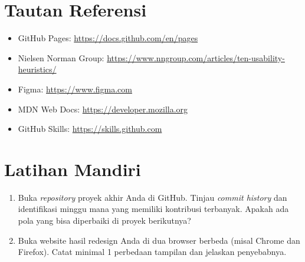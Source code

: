 \section{Tautan Referensi}
\label{sec:referensi-minggu-16}

\begin{itemize}
  \item GitHub Pages: \url{https://docs.github.com/en/pages}
  \item Nielsen Norman Group: \url{https://www.nngroup.com/articles/ten-usability-heuristics/}
  \item Figma: \url{https://www.figma.com}
  \item MDN Web Docs: \url{https://developer.mozilla.org}
  \item GitHub Skills: \url{https://skills.github.com}
\end{itemize}

\section{Latihan Mandiri}
\label{sec:latihan-minggu-16}

\begin{latihan}
\begin{enumerate}[label=\alph*., leftmargin=2em, itemsep=2pt]
  \item Buka \emph{repository} proyek akhir Anda di GitHub. Tinjau \emph{commit history} dan identifikasi minggu mana yang memiliki kontribusi terbanyak. Apakah ada pola yang bisa diperbaiki di proyek berikutnya?
  \item Buka website hasil redesign Anda di dua browser berbeda (misal Chrome dan Firefox). Catat minimal 1 perbedaan tampilan dan jelaskan penyebabnya.
\end{enumerate}
\end{latihan}
